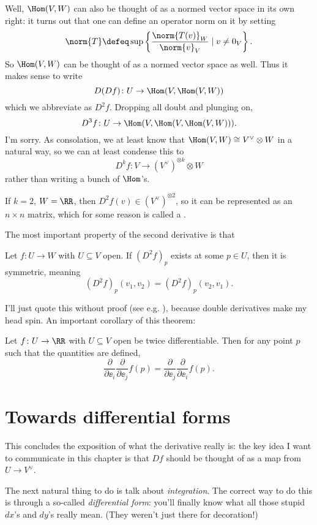 Well, $\Hom(V,W)$ can also be thought of as a normed vector space in its own right:
it turns out that one can define an operator norm on it by setting
\[ \norm{T} \defeq \sup \left\{ \frac{\norm{T(v)}_W}{\norm{v}_V} \mid v \neq 0_V \right\}. \]
So $\Hom(V,W)$ can be thought of as a normed vector space as well.
Thus it makes sense to write
\[ D(Df) \colon U \to \Hom(V,\Hom(V,W)) \]
which we abbreviate as $D^2 f$. Dropping all doubt and plunging on,
\[ D^3f \colon U \to \Hom(V, \Hom(V,\Hom(V,W))). \]
I'm sorry.
As consolation, we at least know that $\Hom(V,W) \cong V^\vee \otimes W$ in a natural way,
so we can at least condense this to
\[ D^kf \colon V \to (V^\vee)^{\otimes k} \otimes W \]
rather than writing a bunch of $\Hom$'s.
\begin{remark}
	If $k=2$, $W = \RR$, then $D^2f(v) \in (V^\vee)^{\otimes 2}$,
	so it can be represented as an $n \times n$ matrix,
	which for some reason is called a .
\end{remark}
The most important property of the second derivative is that
\begin{theorem}
	[Symmetry of $D^2 f$]
	Let $f \colon U \to W$ with $U \subseteq V$ open.
	If $(D^2f)_p$ exists at some $p \in U$, then it is symmetric, meaning
	\[ (D^2f)_p(v_1, v_2) = (D^2f)_p(v_2, v_1). \]
\end{theorem}
I'll just quote this without proof (see e.g. \cite[\S5, theorem 16]{ref:pugh}),
because double derivatives make my head spin.
An important corollary of this theorem:
\begin{corollary}
	Let $f \colon U \to \RR$ with $U \subseteq V$ open be twice differentiable.
	Then for any point $p$ such that the quantities are defined,
	\[
		\frac{\partial}{\partial \ee_i}
		\frac{\partial}{\partial \ee_j}
		f(p)
		=
		\frac{\partial}{\partial \ee_j}
		\frac{\partial}{\partial \ee_i}
		f(p).
	\]
\end{corollary}

\section{Towards differential forms}
This concludes the exposition of what the derivative really is:
the key idea I want to communicate in this chapter is that $Df$
should be thought of as a map from $U \to V^\vee$.

The next natural thing to do is talk about \emph{integration}.
The correct way to do this is through a so-called \emph{differential form}:
you'll finally know what all those stupid $dx$'s and $dy$'s really mean.
(They weren't just there for decoration!)

